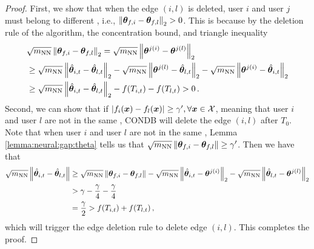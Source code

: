 \begin{proof}
First, we show that when the edge $(i,l)$ is deleted, user $i$ and user $j$ must belong to different \gtclusters{}, i.e., $\left\| \boldsymbol{\theta}_{f,i}-\boldsymbol{\theta}_{f,l} \right\|_2>0$. 
This is because by the deletion rule of the algorithm, the concentration bound, and triangle inequality
\begin{align}
   &\sqrt{m_{\text{NN}}}\left\| \boldsymbol{\theta}_{f,i}-\boldsymbol{\theta}_{f,l} \right\|_2=\sqrt{m_{\text{NN}}}\left\| \boldsymbol{\theta}^{j(i)}-\boldsymbol{\theta}^{j(l)} \right\|_2\notag\\
   &\geq \sqrt{m_{\text{NN}}}\left\| \hat{\boldsymbol{\theta}}_{i,t}-\hat{\boldsymbol{\theta}}_{l,t} \right\|_2 - \sqrt{m_{\text{NN}}}\left\| \boldsymbol{\theta}^{j(l)}-\hat{\boldsymbol{\theta}}_{l,t} \right\|_2 - \sqrt{m_{\text{NN}}}\left\| \boldsymbol{\theta}^{j(i)}-\hat{\boldsymbol{\theta}}_{i,t} \right\|_2\notag\\
   &\geq \sqrt{m_{\text{NN}}}\left\| \hat{\boldsymbol{\theta}}_{i,t}-\hat{\boldsymbol{\theta}}_{l,t} \right\|_2-f(T_{i,t})-f(T_{l,t})>0 \,.
\end{align}
Second, we can show that if 
$|f_i(\boldsymbol{x}) - f_l(\boldsymbol{x})| \geq \gamma',\forall \boldsymbol{x}\in\mathcal{X}$,
meaning that user $i$ and user $l$ are not in the same \gtcluster, CONDB will delete the edge $(i,l)$ after $T_0$.
Note that when user $i$ and user $l$ are not in the same \gtcluster, Lemma \ref{lemma:neural:gap:theta} tells us that $\sqrt{m_{\text{NN}}} \left\| \boldsymbol{\theta}_{f,i} - \boldsymbol{\theta}_{f,l} \right\| \geq \gamma'$.
Then we have that
\begin{align}
    \sqrt{m_{\text{NN}}}\left\| \hat{\boldsymbol{\theta}}_{i,t}-\hat{\boldsymbol{\theta}}_{l,t} \right\|&\geq \sqrt{m_{\text{NN}}}\left\| \boldsymbol{\theta}_{f,i}-\boldsymbol{\theta}_{f,l} \right\|- \sqrt{m_{\text{NN}}}\left\| \hat{\boldsymbol{\theta}}_{i,t}-\boldsymbol{\theta}^{j(i)} \right\|_2-\sqrt{m_{\text{NN}}}\left\| \hat{\boldsymbol{\theta}}_{l,t}-\boldsymbol{\theta}^{j(l)} \right\|_2\notag\\
    &>\gamma-\frac{\gamma}{4}-\frac{\gamma}{4}\notag\\
    &=\frac{\gamma}{2}>f(T_{i,t})+f(T_{l,t})\,,
\end{align}
which will trigger the edge deletion rule to delete edge $(i,l)$. 
This completes the proof.
\end{proof}

